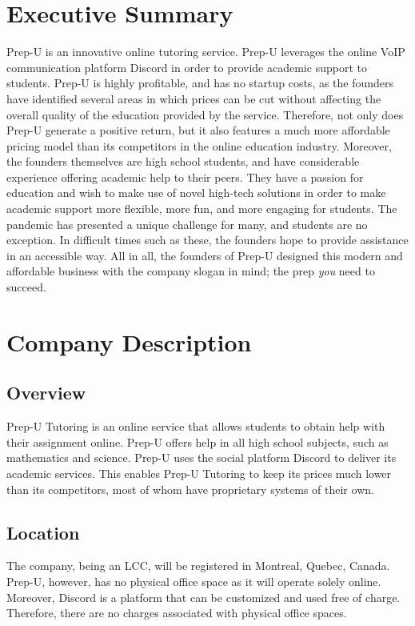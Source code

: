 \documentclass{business}
\begin{document}
    \maketitle
    \tableofcontents
    \newpage
    \section{Executive Summary}
    Prep-U is an innovative online tutoring service. Prep-U leverages the online VoIP communication platform Discord in order to provide academic support to students. Prep-U is highly profitable, and has no startup costs, as the founders have identified several areas in which prices can be cut without affecting the overall quality of the education provided by the service. Therefore, not only does Prep-U generate a positive return, but it also features a much more affordable pricing model than its competitors in the online education industry. Moreover, the founders themselves are high school students, and have considerable experience offering academic help to their peers. They have a passion for education and wish to make use of novel high-tech solutions in order to make academic support more flexible, more fun, and more engaging for students. The pandemic has presented a unique challenge for many, and students are no exception. In difficult times such as these, the founders hope to provide assistance in an accessible way. All in all, the founders of Prep-U designed this modern and affordable business with the company slogan in mind; the prep \emph{you} need to succeed.
    \section{Company Description}
    \subsection{Overview}
    Prep-U Tutoring is an online service that allows students to obtain help with their assignment online. Prep-U offers help in all high school subjects, such as mathematics and science. Prep-U uses the social platform Discord to deliver its academic services. This enables Prep-U Tutoring to keep its prices much lower than its competitors, most of whom have proprietary systems of their own.
    \subsection{Location}
    The company, being an LCC, will be registered in Montreal, Quebec, Canada. Prep-U, however, has no physical office space as it will operate solely online. Moreover, Discord is a platform that can be customized and used free of charge. Therefore, there are no charges associated with physical office spaces. 
\end{document}
